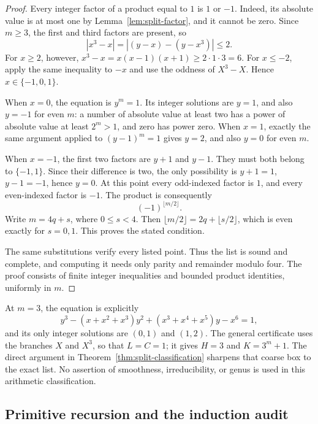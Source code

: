 \begin{proof}
Every integer factor of a product equal to \(1\) is \(1\) or \(-1\).
Indeed, its absolute value is at most one by
Lemma~\ref{lem:split-factor}, and it cannot be zero.
Since \(m\geq3\), the first and third factors are present, so
\[
 |x^3-x|
 =|(y-x)-(y-x^3)|\leq2.
\]
For \(x\geq2\), however,
\(x^3-x=x(x-1)(x+1)\geq2\cdot1\cdot3=6\).
For \(x\leq-2\), apply the same inequality to \(-x\) and use the
oddness of \(X^3-X\).  Hence \(x\in\{-1,0,1\}\).

When \(x=0\), the equation is \(y^m=1\).
Its integer solutions are \(y=1\), and also \(y=-1\) for even
\(m\): a number of absolute value at least two has a power of
absolute value at least \(2^m>1\), and zero has power zero.
When \(x=1\), exactly the same argument applied to
\((y-1)^m=1\) gives \(y=2\), and also \(y=0\) for even \(m\).

When \(x=-1\), the first two factors are \(y+1\) and \(y-1\).
They must both belong to \(\{-1,1\}\).  Since their difference is
two, the only possibility is \(y+1=1\), \(y-1=-1\), hence \(y=0\).
At this point every odd-indexed factor is \(1\), and every even-indexed
factor is \(-1\).  The product is consequently
\[
 (-1)^{\lfloor m/2\rfloor}.
\]
Write \(m=4q+s\), where \(0\leq s<4\).  Then
\(\lfloor m/2\rfloor=2q+\lfloor s/2\rfloor\), which is even
exactly for \(s=0,1\).  This proves the stated condition.

The same substitutions verify every listed point.  Thus the list is
sound and complete, and computing it needs only parity and remainder
modulo four.  The proof consists of finite integer inequalities and
bounded product identities, uniformly in \(m\).
\end{proof}

At \(m=3\), the equation is explicitly
\[
 y^3-(x+x^2+x^3)y^2+(x^3+x^4+x^5)y-x^6=1,
\]
and its only integer solutions are \((0,1)\) and \((1,2)\).
The general certificate uses the branches \(X\) and \(X^3\),
so that \(L=C=1\); it gives \(H=3\) and \(K=3^m+1\).
The direct argument in Theorem~\ref{thm:split-classification} sharpens
that coarse box to the exact list.  No assertion of smoothness,
irreducibility, or genus is used in this arithmetic classification.

\subsection{Primitive recursion and the induction audit}
\label{subsec:split-audit}

